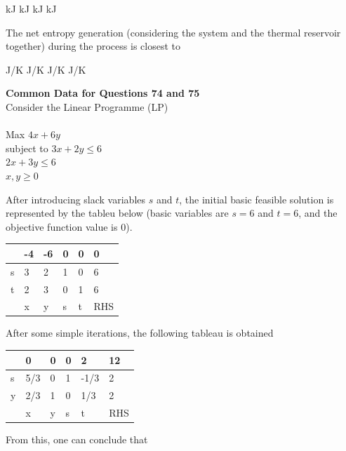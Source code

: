 \documentclass[addpoints,11pt]{exam}
\begin{document}
\begin{questions}
    \begin{oneparchoices}
         kJ
         kJ
         kJ
         kJ
    \end{oneparchoices}

    \question The net entropy generation (considering the system and the thermal reservoir together) during the process is closest to

    \begin{oneparchoices}
         J/K
         J/K
         J/K
         J/K
    \end{oneparchoices}

\pagebreak
\normalsize\textbf{Common Data for Questions 74 and 75}\\
Consider the Linear Programme (LP)\\\\
Max $4x + 6y$\\
subject to
$3x+2y\le6$\\
$2x+3y\le6$\\
$x,y\ge0$

    \question After introducing slack variables $s$ and $t$, the initial basic feasible solution is represented by the tableu below (basic variables are $s=6$ and $t=6$, and the objective function value is 0).\\
    \begin{center}
        \begin{tabular}{|l|l|l|l|l|l|}
            \hline
            &-4&-6&0&0&0\\\hline
            s&3&2&1&0&6\\\hline
            t&2&3&0&1&6\\\hline
            &x&y&s&t&RHS\\\hline
        \end{tabular}
    \end{center}
    After some simple iterations, the following tableau is obtained
    \begin{center}
        \begin{tabular}{|l|l|l|l|l|l|}
            \hline
            &0&0&0&2&12\\\hline
            s&5/3&0&1&-1/3&2\\\hline
            y&2/3&1&0&1/3&2\\\hline
            &x&y&s&t&RHS\\\hline
        \end{tabular}
    \end{center}
    From this, one can conclude that


\end{questions}
\end{document}
